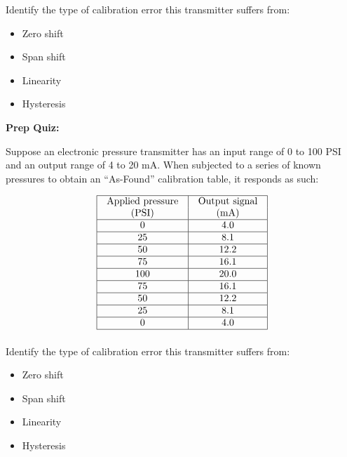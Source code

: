 \documentclass[12pt,a4paper]{article}
\begin{document}
\vskip 10pt

Identify the type of calibration error this transmitter suffers from:

\begin{itemize}
\item{} Zero shift
\vskip 5pt 
\item{} Span shift
\vskip 5pt 
\item{} Linearity
\vskip 5pt 
\item{} Hysteresis
\end{itemize}



\vfil \eject

\noindent
{\bf Prep Quiz:}

Suppose an electronic pressure transmitter has an input range of 0 to 100 PSI and an output range of 4 to 20 mA.  When subjected to a series of known pressures to obtain an ``As-Found'' calibration table, it responds as such:


$$\vbox{\offinterlineskip
\halign{\strut
\vrule \quad\hfil # \ \hfil & 
\vrule \quad\hfil # \ \hfil \vrule \cr
\noalign{\hrule}
%
Applied pressure & Output signal \cr
%
(PSI) & (mA) \cr
%
\noalign{\hrule}
%
0 & 4.0 \cr
%
\noalign{\hrule}
%
25 & 8.1 \cr
%
\noalign{\hrule}
%
50 & 12.2 \cr
%
\noalign{\hrule}
%
75 & 16.1 \cr
%
\noalign{\hrule}
%
100 & 20.0 \cr
%
\noalign{\hrule}
%
75 & 16.1 \cr
%
\noalign{\hrule}
%
50 & 12.2 \cr
%
\noalign{\hrule}
%
25 & 8.1 \cr
%
\noalign{\hrule}
%
0 & 4.0 \cr
%
\noalign{\hrule}
} %
}$$ %

\vskip 10pt

Identify the type of calibration error this transmitter suffers from:

\begin{itemize}
\item{} Zero shift
\vskip 5pt 
\item{} Span shift
\vskip 5pt 
\item{} Linearity
\vskip 5pt 
\item{} Hysteresis
\end{itemize}




\vfil \eject
\end{document}
